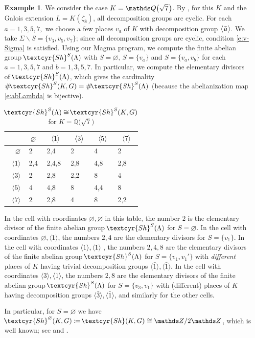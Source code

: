 \documentclass[11pt]{amsart}
\renewcommand{\mathbb}{\mathds}
\newcommand{\Sha}{{\!\textcyr{Sh}}}
\theoremstyle{plain}
\theoremstyle{definition}
\newtheorem{example}[theorem]{Example}
\newcommand{\Q}{{\mathbb Q}}
\newcommand{\Z}{{\mathbb Z}}
\newcommand{\hs}{\kern 0.8pt}
\newcommand{\la}{\langle}
\newcommand{\ra}{\rangle}
\newcommand{\vn}{{\varnothing}}
\begin{document}
\begin{example}\label{ex:cyclic}
We consider the case  $K=\Q\big(\sqrt{7}\hs\big)$.
By \cite[Lemma 7.5.1]{BK},
for this $K$  and the Galois extension $L=K(\zeta_8)$,
all decomposition groups are cyclic.
For each $a=1,3,5,7,$ we choose a few places   $v_a$ of $K$
with decomposition group $\langle\hs\bar a\hs\rangle$.
We take $\Sigma\smallsetminus S=\{v_3,v_5,v_7\}$; since all decomposition groups are cyclic,
condition \eqref{e:v-Sigma} is satisfied.
Using our Magma program, we compute
the finite abelian group $\Sha^S(\Lambda)$
with $S=\varnothing$, $S=\{v_a\}$ and $S=\{v_a,v_b\}$
for each $a=1,3,5,7$ and $b=1,3,5,7$.
In particular, we compute the elementary divisors of $\Sha^S(\Lambda)$,
which gives the cardinality $\#\Sha^S(K,G)=\#\Sha^S(\Lambda)$
(because the abelianization map \eqref{e:abLambda} is bijective).


\begin{longtable}{|r|l|l|l|l|l|}
\caption{$\Sha^S(\Lambda)\cong\Sha^S(K,G)$ for $K=\Q\big(\sqrt7\big)$}
\endfirsthead
\hline
\endhead
\hline
\endfoot
\endlastfoot

\hline
    &$\ \vn$    & \ $\la1\ra\hs$ &\ $\la3\ra\hs$ &\ $\la5\ra\hs$ &\ $\la7\ra\hs$
    \\
\hline
$\vn\ $   &   2    &   2,4   &   2   &   4   & 2
\\
\hline
$\ \la1\ra\ $
& 2,4 & 2,4,8 & 2,8 & 4,8 & 2,8
\\
\hline
$\ \la3\ra\ $
& 2 & 2,8 &  2,2 & 8 & 4
\\
\hline
$\ \la5\ra\ $
& 4 & 4,8 & 8 & 4,4  & 8
\\
\hline
$\ \la7\ra\ $
& 2 & 2,8  & 4  & 8 & 2,2
\\
\hline
\end{longtable}
In the cell with coordinates $\vn,\vn$ in this table,
the number $2$ is the elementary divisor
of the finite abelian group $\Sha^S(\Lambda)$
for $S=\vn$.
In the cell with coordinates $\vn, \la1\ra$,
the numbers $2,4$ are the elementary divisors for $S=\{v_1\}$.
In the cell with coordinates
$\la1\ra,\la1\ra$ ,
the numbers $2,4,8$ are the elementary divisors
of the finite abelian group $\Sha^S(\Lambda)$
for $S=\{v_1,v_1'\}$ with {\em different} places
of $K$ having trivial decomposition groups
$\la\bar 1\ra,\la\bar 1\ra$.
In the cell with coordinates $\la3\ra,\la1\ra$,
the numbers $2,8$ are the elementary divisors of the finite abelian group $\Sha^S(\Lambda)$
for  $S=\{v_3,v_1\}$ with (different) places
of $K$ having  decomposition groups $\la\bar 3\ra,\la\bar 1\ra$,
and similarly for the other cells.

In particular, for $S=\vn$ we have $\Sha^\vn(K,G)\coloneqq\Sha(K,G)\cong\Z/2\Z$,
which is well known; see \cite[(3.7)]{Sansuc} and \cite[Remark 7.5.4]{BK}.
\end{example}
\end{document}
